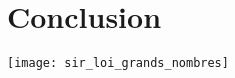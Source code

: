 \section{Conclusion}

\begin{frame}
    \centering
    \texttt{[image: sir\_loi\_grands\_nombres]}
\end{frame}
